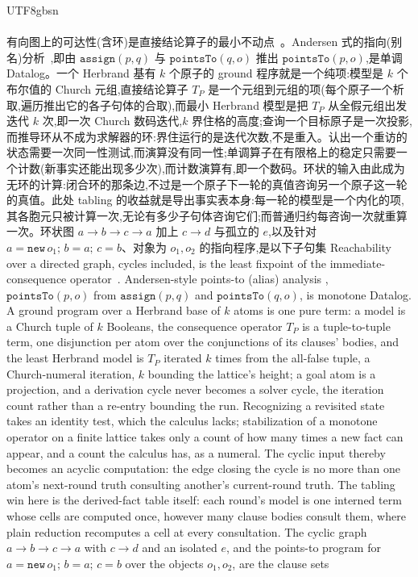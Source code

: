 \begin{CJK*}{UTF8}{gbsn}
  \paragraph{}
  \ifPaperChinese 有向图上的可达性(含环)是直接结论算子的最小不动点~\cite{vanemden1976-predicate-logic-semantics}。Andersen 式的指向(别名)分析~\cite{andersen1994-program-analysis-c, bravenboer2009-doop},即由 $\mathtt{assign}(p,q)$ 与 $\mathtt{pointsTo}(q,o)$ 推出 $\mathtt{pointsTo}(p,o)$,是单调 Datalog。一个 Herbrand 基有 $k$ 个原子的 ground 程序就是一个纯项:模型是 $k$ 个布尔值的 Church 元组,直接结论算子 $T_P$ 是一个元组到元组的项(每个原子一个析取,遍历推出它的各子句体的合取),而最小 Herbrand 模型是把 $T_P$ 从全假元组出发迭代 $k$ 次,即一次 Church 数码迭代,$k$ 界住格的高度;查询一个目标原子是一次投影,而推导环从不成为求解器的环:界住运行的是迭代次数,不是重入。认出一个重访的状态需要一次同一性测试,而演算没有同一性;单调算子在有限格上的稳定只需要一个计数(新事实还能出现多少次),而计数演算有,即一个数码。环状的输入由此成为无环的计算:闭合环的那条边,不过是一个原子下一轮的真值咨询另一个原子这一轮的真值。此处 tabling 的收益就是导出事实表本身:每一轮的模型是一个内化的项,其各胞元只被计算一次,无论有多少子句体咨询它们;而普通归约每咨询一次就重算一次。环状图 $a\to b\to c\to a$ 加上 $c\to d$ 与孤立的 $e$,以及针对 $a=\mathtt{new}\,o_1;\,b=a;\,c=b$、对象为 $o_1, o_2$ 的指向程序,是以下子句集 \else Reachability over a directed graph, cycles included, is the least fixpoint of the immediate-consequence operator~\cite{vanemden1976-predicate-logic-semantics}. Andersen-style points-to (alias) analysis \cite{andersen1994-program-analysis-c, bravenboer2009-doop}, $\mathtt{pointsTo}(p,o)$ from $\mathtt{assign}(p,q)$ and $\mathtt{pointsTo}(q,o)$, is monotone Datalog. A ground program over a Herbrand base of $k$ atoms is one pure term: a model is a Church tuple of $k$ Booleans, the consequence operator $T_P$ is a tuple-to-tuple term, one disjunction per atom over the conjunctions of its clauses' bodies, and the least Herbrand model is $T_P$ iterated $k$ times from the all-false tuple, a Church-numeral iteration, $k$ bounding the lattice's height; a goal atom is a projection, and a derivation cycle never becomes a solver cycle, the iteration count rather than a re-entry bounding the run. Recognizing a revisited state takes an identity test, which the calculus lacks; stabilization of a monotone operator on a finite lattice takes only a count of how many times a new fact can appear, and a count the calculus has, as a numeral. The cyclic input thereby becomes an acyclic computation: the edge closing the cycle is no more than one atom's next-round truth consulting another's current-round truth. The tabling win here is the derived-fact table itself: each round's model is one interned term whose cells are computed once, however many clause bodies consult them, where plain reduction recomputes a cell at every consultation. The cyclic graph $a\to b\to c\to a$ with $c\to d$ and an isolated $e$, and the points-to program for $a=\mathtt{new}\,o_1;\,b=a;\,c=b$ over the objects $o_1, o_2$, are the clause sets \fi

\end{CJK*}
